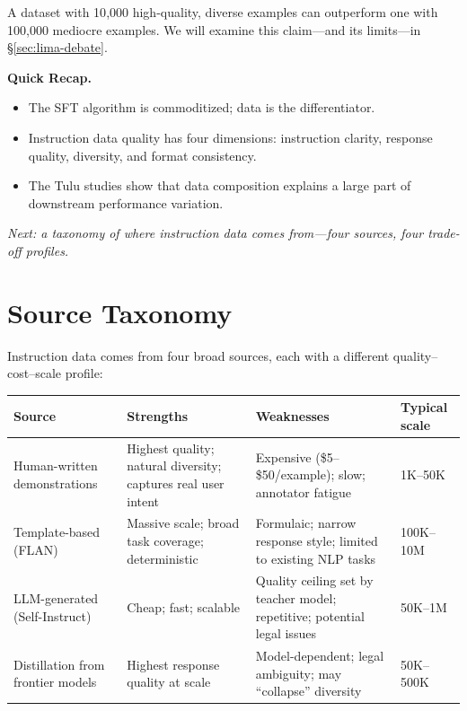 A dataset with 10{,}000 high-quality, diverse examples can outperform one with 100{,}000 mediocre examples. We will examine this claim---and its limits---in \S\ref{sec:lima-debate}.

\begin{quickrecap}
\textbf{Quick Recap.}
\begin{itemize}[nosep,leftmargin=1.5em]
  \item The SFT algorithm is commoditized; data is the differentiator.
  \item Instruction data quality has four dimensions: instruction clarity, response quality, diversity, and format consistency.
  \item The Tulu studies show that data composition explains a large part of downstream performance variation.
\end{itemize}
\textit{Next: a taxonomy of where instruction data comes from---four sources, four trade-off profiles.}
\end{quickrecap}


\section{Source Taxonomy}
\label{sec:source-taxonomy}

Instruction data comes from four broad sources, each with a different quality--cost--scale profile:

\begin{center}
\begin{tabularx}{\textwidth}{@{}p{3cm}XXp{2.8cm}@{}}
\toprule
\textbf{Source} & \textbf{Strengths} & \textbf{Weaknesses} & \textbf{Typical scale} \\
\midrule
Human-written demonstrations & Highest quality; natural diversity; captures real user intent & Expensive (\$5--\$50/example); slow; annotator fatigue & 1K--50K \\
Template-based (FLAN) & Massive scale; broad task coverage; deterministic & Formulaic; narrow response style; limited to existing NLP tasks & 100K--10M \\
LLM-generated (Self-Instruct) & Cheap; fast; scalable & Quality ceiling set by teacher model; repetitive; potential legal issues & 50K--1M \\
Distillation from frontier models & Highest response quality at scale & Model-dependent; legal ambiguity; may ``collapse'' diversity & 50K--500K \\
\bottomrule
\end{tabularx}
\end{center}

